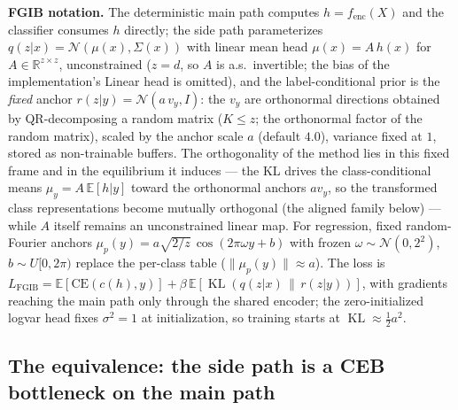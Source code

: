 \textbf{FGIB notation.}
The deterministic main path computes $h = f_{\mathrm{enc}}(X)$ and the classifier
consumes $h$ directly; the side path parameterizes $q(z|x) = \mathcal{N}(\mu(x),
\Sigma(x))$ with linear mean head $\mu(x) = A\,h(x)$ for $A \in \mathbb{R}^{z \times z}$,
unconstrained ($z = d$, so $A$ is a.s.\ invertible; the bias of the implementation's
Linear head is omitted), and the label-conditional prior is the \emph{fixed} anchor
$r(z|y) = \mathcal{N}(a\,v_y, I)$: the $v_y$ are orthonormal directions obtained by
QR-decomposing a random matrix ($K \le z$; the orthonormal factor of the random matrix),
scaled by the anchor scale $a$ (default $4.0$), variance fixed at $1$, stored as
non-trainable buffers. The orthogonality of the method lies in this fixed frame and in
the equilibrium it induces --- the KL drives the class-conditional means
$\mu_y = A\,\mathbb{E}[h|y]$ toward the orthonormal anchors $a v_y$, so the transformed
class representations become mutually orthogonal (the aligned family below) --- while
$A$ itself remains an unconstrained linear map. For regression, fixed random-Fourier
anchors $\mu_p(y) = a\sqrt{2/z}\,\cos(2\pi\omega y + b)$ with frozen
$\omega \sim \mathcal{N}(0, 2^2)$, $b \sim U[0, 2\pi)$ replace the per-class table
($\|\mu_p(y)\| \approx a$). The loss is
$L_{\mathrm{FGIB}} = \mathbb{E}[\mathrm{CE}(c(h), y)]
+ \beta\,\mathbb{E}[\operatorname{KL}(q(z|x)\,\|\,r(z|y))]$, with gradients reaching the
main path only through the shared encoder; the zero-initialized logvar head fixes
$\sigma^2 = 1$ at initialization, so training starts at
$\operatorname{KL} \approx \tfrac12 a^2$.

\subsection{The equivalence: the side path is a CEB bottleneck on the main path}

